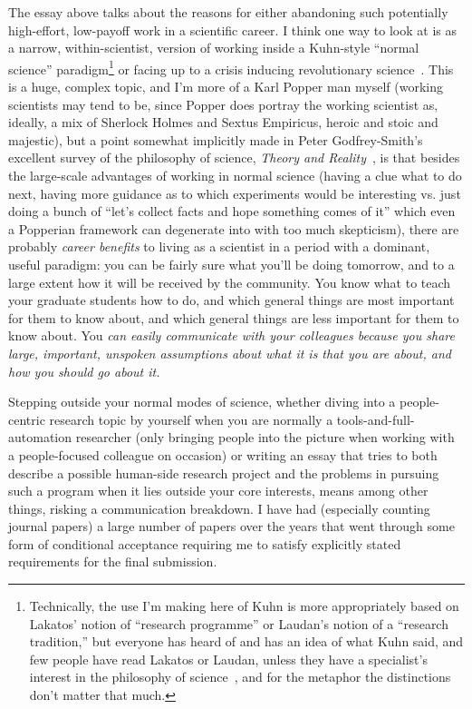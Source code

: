 \documentclass[sigplan,screen]{acmart}
\begin{document}
The essay above talks about the reasons for either abandoning such
potentially high-effort, low-payoff work in a scientific career.  I
think one way to look at is as a narrow, within-scientist, version of
working inside a Kuhn-style ``normal science''
paradigm\footnote{Technically, the use I'm making here of Kuhn is more
  appropriately based on Lakatos' notion of ``research programme'' or
  Laudan's notion of a
  ``research tradition,'' but everyone has heard of and has an idea of
  what Kuhn said, and few people have read Lakatos or Laudan, unless
  they have a specialist's interest in the philosophy of
  science~\cite{godfrey2009theory}, and for the metaphor the
  distinctions don't
  matter that much.} or
facing up to a crisis inducing revolutionary
science~\cite{kuhn1997structure}.  This is a huge, complex topic, and
I'm more of a Karl Popper man myself (working scientists may tend to
be, since Popper does portray the working scientist as, ideally, a mix
of Sherlock Holmes and Sextus Empiricus, heroic and stoic and
majestic), but a point somewhat implicitly made in Peter Godfrey-Smith's excellent survey
of the philosophy of science, \emph{Theory and
  Reality}~\cite{godfrey2009theory}, is that besides the large-scale
advantages of working in normal science (having a clue what to do
next, having more guidance as to which experiments would be
interesting vs. just doing a bunch of ``let's collect facts and hope
something comes of it'' which even a Popperian framework can
degenerate into with too much skepticism), there are probably
\emph{career benefits} to living as a scientist in a period with a
dominant, useful paradigm:  you can be fairly sure what you'll be
doing tomorrow, and to a large extent how it will be received by the
community.  You know what to teach your graduate students how to do,
and which general things are most important for them to know about, and
which general things are less important for them to know about.  You
\emph{can easily communicate with your colleagues because you share
  large, important, unspoken assumptions about what it is that you are
  about, and how you should go about it.}

Stepping outside your normal modes of science, whether diving into a
people-centric research topic by yourself when you are normally a
tools-and-full-automation researcher (only bringing people into the
picture when working with a people-focused colleague on occasion) or
writing an essay that tries to both describe a possible human-side
research project and the problems in pursuing such a program when it
lies outside your core interests, means among other things, risking a
communication breakdown.  I have had (especially counting journal
papers) a large number of papers over the years that went through some
form of conditional acceptance requiring me to satisfy explicitly
stated requirements for the final submission.
\end{document}

